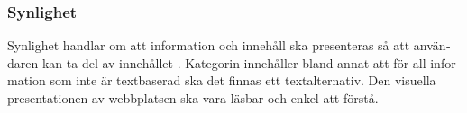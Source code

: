\documentclass[11p]{article}
\begin{document}
\begin{otherlanguage}{swedish}
    \subsubsection{Synlighet} %
    Synlighet handlar om att information och innehåll ska presenteras så att användaren kan ta del av innehållet \parencite{WCAG_2.2}.
    Kategorin innehåller bland annat att för all information som inte är textbaserad ska det finnas ett textalternativ.
    Den visuella presentationen av webbplatsen ska vara läsbar och enkel att förstå.

    

\end{otherlanguage}
\end{document}
